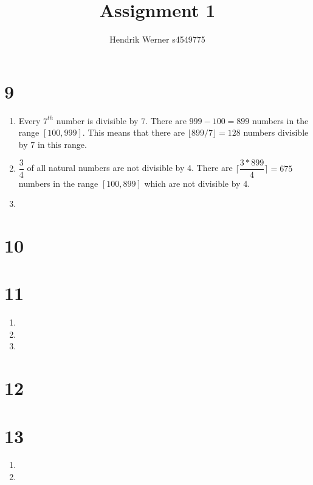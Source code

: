 \documentclass[12pt]{article}
\title{Assignment 1}
\author{
	Hendrik Werner s4549775
}
\begin{document}
\maketitle

\section*{9}
\begin{enumerate}[a]
	\item %
	Every $7^{th}$ number is divisible by 7. There are $999 - 100 = 899$ numbers in the range $[100, 999]$. This means that there are $\lfloor 899 / 7 \rfloor = 128$ numbers divisible by 7 in this range.
	\setcounter{enumi}{3} \item %
	$\dfrac{3}{4}$ of all natural numbers are not divisible by 4. There are $\lceil \dfrac{3 * 899}{4} \rceil = 675$ numbers in the range $[100, 899]$ which are not divisible by 4.
	\setcounter{enumi}{6} \item %
\end{enumerate}

\section*{10}

\section*{11}
\begin{enumerate}[a]
	\item %
	\item %
	\item %
\end{enumerate}

\section*{12}

\section*{13}
\begin{enumerate}[a]
	\item %
	\item %
\end{enumerate}
\end{document}
